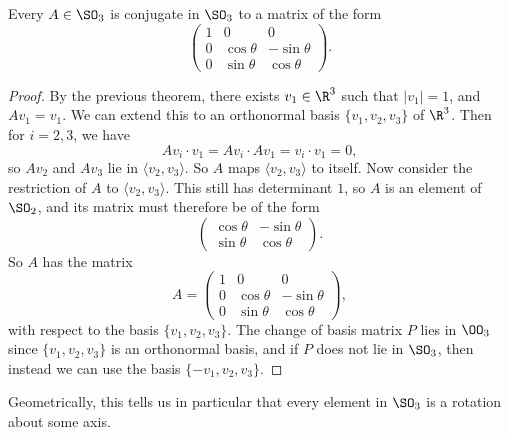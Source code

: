 \documentclass[a4]{scrreprt}
\begin{document}
\begin{corollary}
	Every $A \in \SO_3$ is conjugate in $\SO_3$ to a matrix of the form
	$$
	\begin{pmatrix}
		1 & 0 & 0 \\
		0 & \cos \theta & - \sin \theta \\
		0 & \sin \theta & \cos \theta
	\end{pmatrix}.
	$$
\end{corollary}
\begin{proof}
	By the previous theorem, there exists $v_1 \in \R^3$ such that $|v_1| = 1$, and $Av_1 = v_1$. We can extend this to an orthonormal basis $\{v_1, v_2, v_3\}$ of $\R^3$. Then for $i = 2, 3$, we have 
	$$
Av_i \cdot v_1 = A v_i \cdot Av_1 = v_i \cdot v_1 = 0,
	$$
	so $Av_2$ and $Av_3$ lie in $\langle v_2, v_3 \rangle$. So $A$ maps $\langle v_2, v_3 \rangle$ to itself. Now consider the restriction of $A$ to $\langle v_2, v_3 \rangle$. This still has determinant $1$, so $A$ is an element of $\SO_2$, and its matrix must therefore be of the form
	$$
	\begin{pmatrix}
		\cos \theta & - \sin \theta \\
		\sin \theta & \cos \theta
	\end{pmatrix}.
	$$
	So $A$ has the matrix
	$$
A = \begin{pmatrix}
	1 & 0 & 0 \\
	0 & \cos \theta & - \sin \theta \\
	0 & \sin \theta & \cos \theta
\end{pmatrix},
	$$
	with respect to the basis $\{v_1, v_2, v_3\}$. The change of basis matrix $P$ lies in $\OO_3$ since $\{v_1, v_2, v_3\}$ is an orthonormal basis, and if $P$ does not lie in $\SO_3$, then instead we can use the basis $\{-v_1, v_2, v_3\}$.
\end{proof}

Geometrically, this tells us in particular that every element in $\SO_3$ is a rotation about some axis. 
\end{document}
